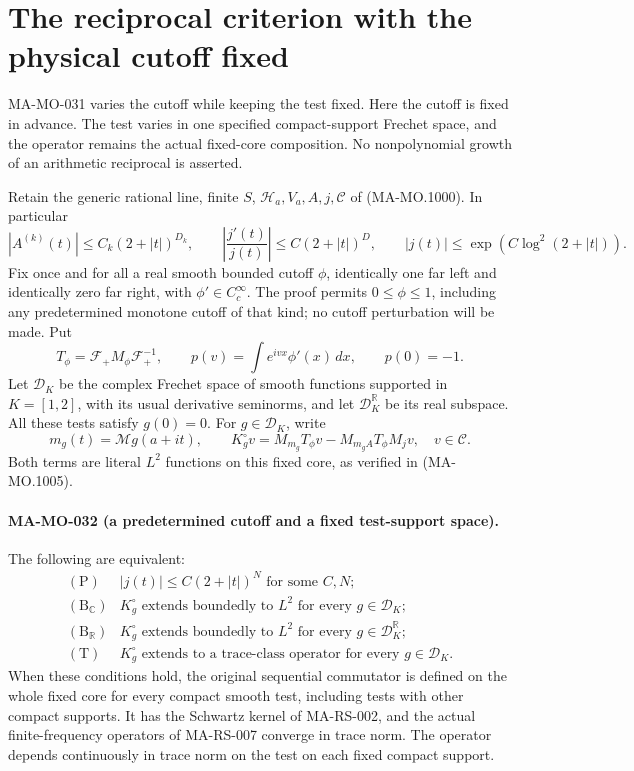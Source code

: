 \section{The reciprocal criterion with the physical cutoff fixed}
\label{sec:fixed-cutoff-reciprocal-criterion}

MA-MO-031 varies the cutoff while keeping the test fixed.
Here the cutoff is fixed in advance.  The test varies in
one specified compact-support Frechet space, and the
operator remains the actual fixed-core composition.
No nonpolynomial growth of an arithmetic reciprocal
is asserted.

Retain the generic rational line, finite \(S\),
\(\mathcal H_a,V_a,A,j,\mathscr C\) of (MA-MO.1000).
In particular
\[
 |A^{(k)}(t)|\le C_k(2+|t|)^{D_k},\qquad
 \left|\frac{j'(t)}{j(t)}\right|
                         \le C(2+|t|)^D,\qquad
 |j(t)|\le\exp(C\log^2(2+|t|)).
\tag{MA-MO.1100}
\]
Fix once and for all a real smooth bounded cutoff
\(\phi\), identically one far left and identically
zero far right, with \(\phi'\in C_c^\infty\).
The proof permits \(0\le\phi\le1\), including any
predetermined monotone cutoff of that kind; no
cutoff perturbation will be made.  Put
\[
 T_\phi=\mathcal F_+M_\phi\mathcal F_+^{-1},\qquad
 p(v)=\int e^{ivx}\phi'(x)\,dx,\qquad
 p(0)=-1 .
\tag{MA-MO.1101}
\]
Let \(\mathscr D_K\) be the complex Frechet space
of smooth functions supported in \(K=[1,2]\),
with its usual derivative seminorms, and let
\(\mathscr D_K^\mathbb R\) be its real subspace.
All these tests satisfy \(g(0)=0\).
For \(g\in\mathscr D_K\), write
\[
 m_g(t)=\mathcal Mg(a+it),\qquad
 K^\circ_gv
   =M_{m_g}T_\phi v-M_{m_gA}T_\phi M_jv,
                           \quad v\in\mathscr C .
\tag{MA-MO.1102}
\]
Both terms are literal \(L^2\) functions on this
fixed core, as verified in (MA-MO.1005).

\paragraph{MA-MO-032 (a predetermined cutoff and a fixed test-support space).}
The following are equivalent:
\[
\begin{array}{ll}
\mathrm{(P)}&
 |j(t)|\le C(2+|t|)^N\text{ for some }C,N;\\[2pt]
\mathrm{(B_{\mathbb C})}&
 K^\circ_g\text{ extends boundedly to }L^2
                         \text{ for every }g\in\mathscr D_K;\\[2pt]
\mathrm{(B_{\mathbb R})}&
 K^\circ_g\text{ extends boundedly to }L^2
                         \text{ for every }g\in\mathscr D_K^\mathbb R;\\[2pt]
\mathrm{(T)}&
 K^\circ_g\text{ extends to a trace-class operator}
                         \text{ for every }g\in\mathscr D_K.
\end{array}
\tag{MA-MO.1103}
\]
When these conditions hold, the original sequential
commutator is defined on the whole fixed core for
every compact smooth test, including tests with
other compact supports.  It has the Schwartz kernel
of MA-RS-002, and the actual finite-frequency
operators of MA-RS-007 converge in trace norm.
The operator depends continuously in trace norm
on the test on each fixed compact support.

